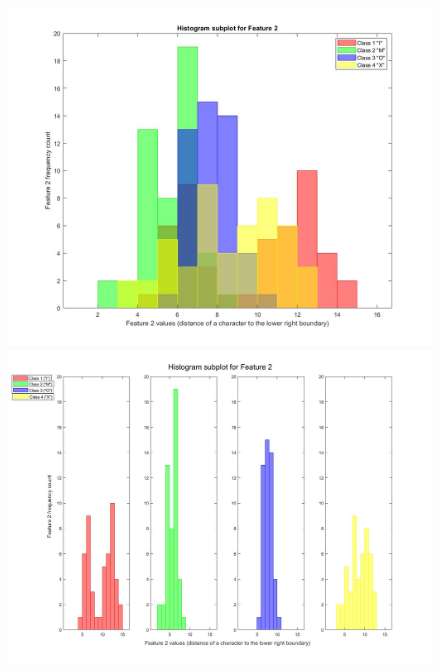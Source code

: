 \documentclass[a4paper,12pt]{article}
\begin{document}
\begin{figure}[H]
\centering
\includegraphics[scale=0.3]{q1pc_2.jpg}
\includegraphics[scale=0.3]{q1pcs_2.jpg}
\end{figure}
\pagebreak
\end{document}
